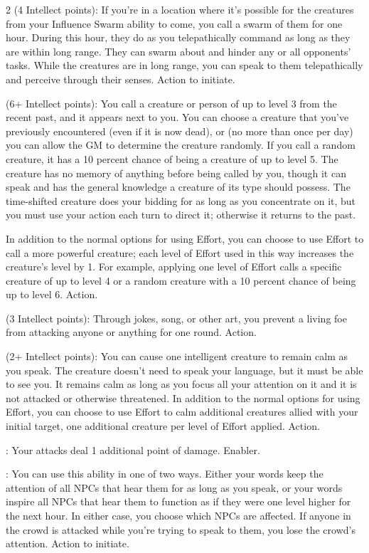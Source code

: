 \begin{multicols}{2}
 (4 Intellect points): If you’re in a location where it’s possible for the creatures from your Influence Swarm ability to come, you call a swarm of them for one hour. During this hour, they do as you telepathically command as long as they are within long range. They can swarm about and hinder any or all opponents’ tasks. While the creatures are in long range, you can speak to them telepathically and perceive through their senses. Action to initiate. 

 (6+ Intellect points): You call a creature or person of up to level 3 from the recent past, and it appears next to you. You can choose a creature that you’ve previously encountered (even if it is now dead), or (no more than once per day) you can allow the GM to determine the creature randomly. If you call a random creature, it has a 10 percent chance of being a creature of up to level 5. The creature has no memory of anything before being called by you, though it can speak and has the general knowledge a creature of its type should possess. The time-shifted creature does your bidding for as long as you concentrate on it, but you must use your action each turn to direct it; otherwise it returns to the past. 

In addition to the normal options for using Effort, you can choose to use Effort to call a more powerful creature; each level of Effort used in this way increases the creature’s level by 1. For example, applying one level of Effort calls a specific creature of up to level 4 or a random creature with a 10 percent chance of being up to level 6. Action. 

 (3 Intellect points): Through jokes, song, or other art, you prevent a living foe from attacking anyone or anything for one round. Action. 

 (2+ Intellect points): You can cause one intelligent creature to remain calm as you speak. The creature doesn’t need to speak your language, but it must be able to see you. It remains calm as long as you focus all your attention on it and it is not attacked or otherwise threatened. In addition to the normal options for using Effort, you can choose to use Effort to calm additional creatures allied with your initial target, one additional creature per level of Effort applied. Action. 

: Your attacks deal 1 additional point of damage. Enabler. 

: You can use this ability in one of two ways. Either your words keep the attention of all NPCs that hear them for as long as you speak, or your words inspire all NPCs that hear them to function as if they were one level higher for the next hour. In either case, you choose which NPCs are affected. If anyone in the crowd is attacked while you’re trying to speak to them, you lose the crowd’s attention. Action to initiate. 


\end{multicols}
